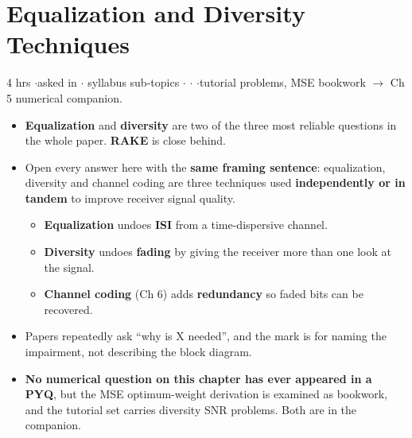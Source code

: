 \section{Equalization and Diversity Techniques}

{\color{sub}\footnotesize 4 hrs \gap$\cdot$\gap asked in 
\gap$\cdot$ syllabus sub-topics \gap$\cdot$\gap {} \gap$\cdot$\gap {} \gap$\cdot$\gap tutorial problems, MSE bookwork
$\rightarrow$ Ch 5 numerical companion.}

\begin{itemize}
  \item \textbf{Equalization}  and \textbf{diversity}  are two of the three most
        reliable questions in the whole paper. \textbf{RAKE}  is close behind.
  \item Open every answer here with the \textbf{same framing sentence}: equalization, diversity
        and channel coding are three techniques used \textbf{independently or in tandem} to
        improve receiver signal quality.
  \begin{itemize}
    \item \textbf{Equalization} undoes \textbf{ISI} from a time-dispersive channel.
    \item \textbf{Diversity} undoes \textbf{fading} by giving the receiver more than one look at
          the signal.
    \item \textbf{Channel coding} (Ch 6) adds \textbf{redundancy} so faded bits can be recovered.
  \end{itemize}
  \item {} Papers repeatedly ask ``why is X needed'',
        and the mark is for naming the impairment, not describing the block diagram.
  \item \textbf{No numerical question on this chapter has ever appeared in a PYQ}, but the MSE
        optimum-weight derivation  is examined as bookwork, and the tutorial set carries
        diversity SNR problems. Both are in the companion.
\end{itemize}

\hr


